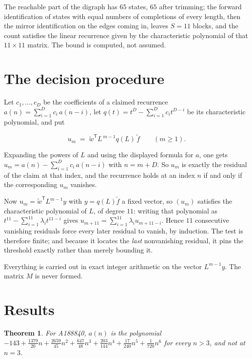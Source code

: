 \documentclass[11pt]{article}
\newtheorem{theorem}{Theorem}
\theoremstyle{definition}
\begin{document}
The reachable part of the digraph has $65$ states, $65$ after trimming; the forward identification of states with equal numbers of completions of every length, then the mirror identification on the edges coming in, leaves $S = 11$ blocks, and the count satisfies the linear recurrence given by the characteristic polynomial of that $11\times11$ matrix. The bound is computed, not assumed.

\section{The decision procedure}

Let $c_1,\dots,c_D$ be the coefficients of a claimed recurrence $a(n) = \sum_{i=1}^{D} c_i\,a(n-i)$, let $q(t) = t^{D} - \sum_{i=1}^{D} c_i t^{D-i}$ be its characteristic polynomial, and put

\[u_m \;=\; \tilde w^{\mathsf T} L^{\,m-1} q(L)\,\tilde f \qquad (m \ge 1).\]

Expanding the powers of $L$ and using the displayed formula for $a$, one gets $u_m = a(n) - \sum_{i=1}^{D} c_i\,a(n-i)$ with $n = m + D$. So $u_m$ is exactly the residual of the claim at that index, and the recurrence holds at an index $n$ if and only if the corresponding $u_m$ vanishes.

Now $u_m = \tilde w^{\mathsf T} L^{m-1} y$ with $y = q(L)\tilde f$ a fixed vector, so $(u_m)$ satisfies the characteristic polynomial of $L$, of degree $11$: writing that polynomial as $t^{11} - \sum_{i=1}^{11} \lambda_i t^{11-i}$ gives $u_{m+11} = \sum_{i=1}^{11} \lambda_i u_{m+11-i}$. Hence $11$ consecutive vanishing residuals force every later residual to vanish, by induction. The test is therefore finite; and because it locates the {\itshape last} nonvanishing residual, it pins the threshold exactly rather than merely bounding it.

Everything is carried out in exact integer arithmetic on the vector $L^{m-1}y$. The matrix $M$ is never formed.

\section{Results}

\begin{theorem} For A188840, $a(n)$ is the polynomial $-143 + \frac{1379}{20}n + \frac{2659}{45}n^{2} + \frac{647}{48}n^{3} + \frac{203}{144}n^{4} + \frac{17}{240}n^{5} + \frac{1}{720}n^{6}$ for every $n > 3$, and not at $n = 3$.\end{theorem}
\end{document}
